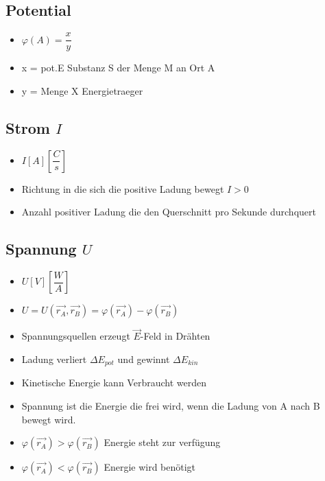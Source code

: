 \documentclass[8pt,a4paper]{scrartcl}
\begin{document}
\begin{multicols*}{3}
\begin{itemize}
			\end{itemize}
		\subsection{Potential }
			\begin{itemize}\itemsep0pt			
				\item $\varphi (A)=\dfrac{x}{y}$
				\item x = pot.E Substanz S der Menge M an Ort A
				\item y = Menge X Energietraeger
			\end{itemize}
			
		\subsection{Strom $I$}
			\begin{itemize}\itemsep0pt				
				\item $I [A] [\dfrac{C}{s}]$
				\item Richtung in die sich die positive Ladung bewegt $I>0$
				\item Anzahl positiver Ladung die den Querschnitt pro Sekunde durchquert
			\end{itemize}
			
		\subsection{Spannung $U$}
			\begin{itemize}\itemsep0pt				
				\item $U [V] [\dfrac{W}{A}]$
				\item $U=U(\overrightarrow{r_{A}},\overrightarrow{r_{B}})=\varphi(\overrightarrow{r_{A}})-\varphi(\overrightarrow{r_{B}})$
				\item Spannungsquellen erzeugt $\overrightarrow{E}$-Feld in Drähten
				\item Ladung verliert $\Delta E_{pot}$ und gewinnt $\Delta E_{kin}$
				\item Kinetische Energie kann Verbraucht werden
				\item Spannung ist die Energie die frei wird, wenn die Ladung von A nach B bewegt wird.
				\item $\varphi(\overrightarrow{r_{A}})>\varphi(\overrightarrow{r_{B}})$ Energie steht zur verfügung
				\item $\varphi(\overrightarrow{r_{A}})<\varphi(\overrightarrow{r_{B}})$ Energie wird benötigt
			\end{itemize}
			

\end{multicols*}
\end{document}
